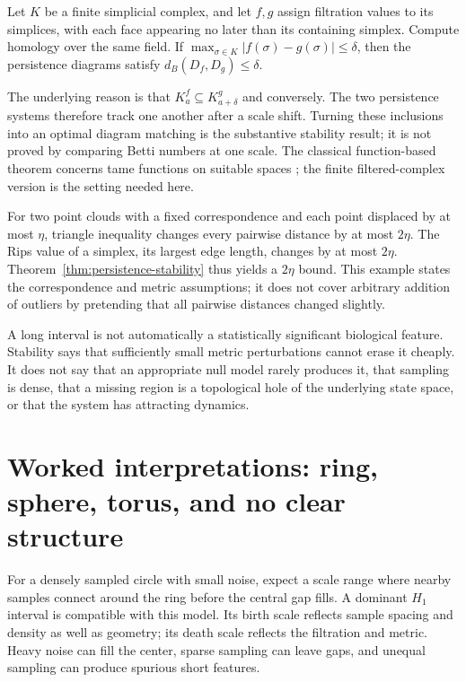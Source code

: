 \begin{theorem}\label{thm:persistence-stability}
Let $K$ be a finite simplicial complex, and let $f,g$ assign filtration values to its simplices, with each face appearing no later than its containing simplex. Compute homology over the same field. If $\max_{\sigma\in K}|f(\sigma)-g(\sigma)|\leq\delta$, then the persistence diagrams satisfy $d_B(D_f,D_g)\leq\delta$.
\end{theorem}
The underlying reason is that $K^f_a\subseteq K^g_{a+\delta}$ and conversely. The two persistence systems therefore track one another after a scale shift. Turning these inclusions into an optimal diagram matching is the substantive stability result; it is not proved by comparing Betti numbers at one scale. The classical function-based theorem concerns tame functions on suitable spaces \citep{cohensteiner2007}; the finite filtered-complex version is the setting needed here.

For two point clouds with a fixed correspondence and each point displaced by at most $\eta$, triangle inequality changes every pairwise distance by at most $2\eta$. The Rips value of a simplex, its largest edge length, changes by at most $2\eta$. Theorem~\ref{thm:persistence-stability} thus yields a $2\eta$ bound. This example states the correspondence and metric assumptions; it does not cover arbitrary addition of outliers by pretending that all pairwise distances changed slightly.

\begin{misconception}
A long interval is not automatically a statistically significant biological feature. Stability says that sufficiently small metric perturbations cannot erase it cheaply. It does not say that an appropriate null model rarely produces it, that sampling is dense, that a missing region is a topological hole of the underlying state space, or that the system has attracting dynamics.
\end{misconception}

\section{Worked interpretations: ring, sphere, torus, and no clear structure}
For a densely sampled circle with small noise, expect a scale range where nearby samples connect around the ring before the central gap fills. A dominant $H_1$ interval is compatible with this model. Its birth scale reflects sample spacing and density as well as geometry; its death scale reflects the filtration and metric. Heavy noise can fill the center, sparse sampling can leave gaps, and unequal sampling can produce spurious short features.

